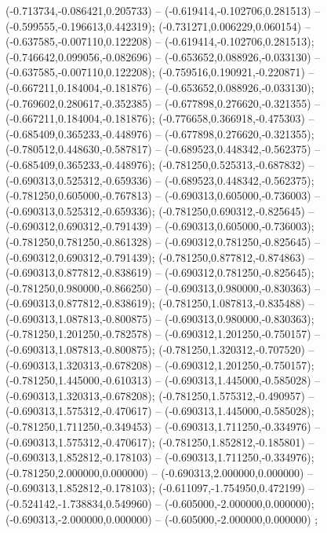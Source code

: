  (-0.713734,-0.086421,0.205733) -- (-0.619414,-0.102706,0.281513) -- (-0.599555,-0.196613,0.442319);
 (-0.731271,0.006229,0.060154) -- (-0.637585,-0.007110,0.122208) -- (-0.619414,-0.102706,0.281513);
 (-0.746642,0.099056,-0.082696) -- (-0.653652,0.088926,-0.033130) -- (-0.637585,-0.007110,0.122208);
 (-0.759516,0.190921,-0.220871) -- (-0.667211,0.184004,-0.181876) -- (-0.653652,0.088926,-0.033130);
 (-0.769602,0.280617,-0.352385) -- (-0.677898,0.276620,-0.321355) -- (-0.667211,0.184004,-0.181876);
 (-0.776658,0.366918,-0.475303) -- (-0.685409,0.365233,-0.448976) -- (-0.677898,0.276620,-0.321355);
 (-0.780512,0.448630,-0.587817) -- (-0.689523,0.448342,-0.562375) -- (-0.685409,0.365233,-0.448976);
 (-0.781250,0.525313,-0.687832) -- (-0.690313,0.525312,-0.659336) -- (-0.689523,0.448342,-0.562375);
 (-0.781250,0.605000,-0.767813) -- (-0.690313,0.605000,-0.736003) -- (-0.690313,0.525312,-0.659336);
 (-0.781250,0.690312,-0.825645) -- (-0.690312,0.690312,-0.791439) -- (-0.690313,0.605000,-0.736003);
 (-0.781250,0.781250,-0.861328) -- (-0.690312,0.781250,-0.825645) -- (-0.690312,0.690312,-0.791439);
 (-0.781250,0.877812,-0.874863) -- (-0.690313,0.877812,-0.838619) -- (-0.690312,0.781250,-0.825645);
 (-0.781250,0.980000,-0.866250) -- (-0.690313,0.980000,-0.830363) -- (-0.690313,0.877812,-0.838619);
 (-0.781250,1.087813,-0.835488) -- (-0.690313,1.087813,-0.800875) -- (-0.690313,0.980000,-0.830363);
 (-0.781250,1.201250,-0.782578) -- (-0.690312,1.201250,-0.750157) -- (-0.690313,1.087813,-0.800875);
 (-0.781250,1.320312,-0.707520) -- (-0.690313,1.320313,-0.678208) -- (-0.690312,1.201250,-0.750157);
 (-0.781250,1.445000,-0.610313) -- (-0.690313,1.445000,-0.585028) -- (-0.690313,1.320313,-0.678208);
 (-0.781250,1.575312,-0.490957) -- (-0.690313,1.575312,-0.470617) -- (-0.690313,1.445000,-0.585028);
 (-0.781250,1.711250,-0.349453) -- (-0.690313,1.711250,-0.334976) -- (-0.690313,1.575312,-0.470617);
 (-0.781250,1.852812,-0.185801) -- (-0.690313,1.852812,-0.178103) -- (-0.690313,1.711250,-0.334976);
 (-0.781250,2.000000,0.000000) -- (-0.690313,2.000000,0.000000) -- (-0.690313,1.852812,-0.178103);
 (-0.611097,-1.754950,0.472199) -- (-0.524142,-1.738834,0.549960) -- (-0.605000,-2.000000,0.000000);
 (-0.690313,-2.000000,0.000000) -- (-0.605000,-2.000000,0.000000) ;
